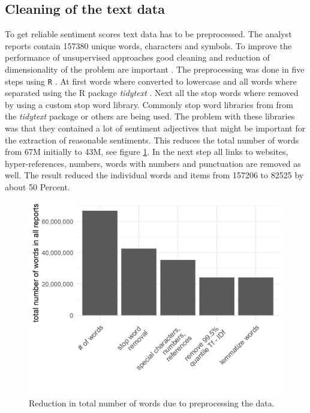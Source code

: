\subsection{Cleaning of the text data}\label{cleaningText}
To get reliable sentiment scores text data has to be preprocessed. The analyst reports contain 157380 unique words, characters and symbols. To improve the performance of unsupervised approaches good cleaning and reduction of dimensionality of the problem are important  \citep{HADDI201326}. The preprocessing was done in five steps using \texttt{R} \citep{Rproject}. At first words where converted to lowercase and all words where separated using the R package \textit{tidytext} \citep{tidytext}. Next all the stop words where removed by using a custom stop word library. Commonly stop word libraries from from the \textit{tidytext} package or others are being used. The problem with these libraries was that they contained a lot of sentiment adjectives that might be important for the extraction of reasonable sentiments. This reduces the total number of words from 67M initially to 43M, see figure \ref{fig:TotWord}. In the next step all links to websites, hyper-references, numbers, words with numbers and punctuation are removed as well. The result reduced the individual words and items from 157206 to 82525 by about 50 Percent. \\
\begin{figure}[h]
\centering
\includegraphics[width=\textwidth]{figures/ReductionInTotalNWords.png}
\caption{Reduction in total number of words due to preprocessing the data.}
\label{fig:TotWord}
\end{figure}

